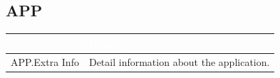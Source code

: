 \subsection*{\hypertarget{link:APP}{APP}}
\label{sec:appendix_c:protocol:APP}

\begin{longtable}{p{}|p{}}   
    \rowcolor{black}\multicolumn{1}{l!\vlinewhite}{\textcolor{white}{Field}}  & \textcolor{white}{Description} \\\hline
    APP.Extra Info  &	Detail information about the application. \\\hline
\end{longtable} 